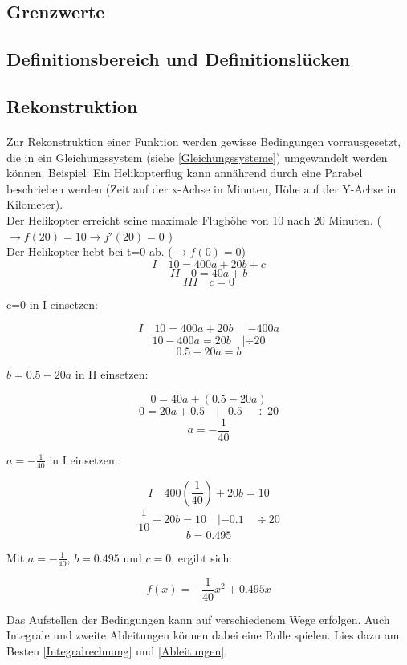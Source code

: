 \documentclass{article}
\begin{document}
	\subsection{Grenzwerte}
	
	\subsection{Definitionsbereich und Definitionslücken}\label{Definitionsbereich}
	\subsection{Rekonstruktion}\label{Rekonstruktion}
		\paragraph{}
			Zur Rekonstruktion einer Funktion werden gewisse Bedingungen vorrausgesetzt, die in ein Gleichungssystem (siehe \ref{Gleichungssysteme}) umgewandelt werden können.
			Beispiel: Ein Helikopterflug kann annährend durch eine Parabel beschrieben werden (Zeit auf der x-Achse in Minuten, Höhe auf der Y-Achse in Kilometer). \\
			Der Helikopter erreicht seine maximale Flughöhe von 10 nach 20 Minuten. ( $ \rightarrow f(20)=10 \rightarrow f'(20)=0 $ ) \\
			Der Helikopter hebt bei t=0 ab. ($ \rightarrow f(0)=0$) \\
			
			\[ I \quad 10=400a+20b+c \]
			\[ II \quad 0=40a+b \]
			\[ III \quad c=0 \]
			
			c=0 in I einsetzen:
			
			\[I \quad 10=400a+20b \quad |-400a \]
			\[ 10-400a=20b \quad | \div 20\]
			\[ 0.5-20a=b\]
			
			$b= 0.5-20a $ in II einsetzen:
			
			\[ 0=40a+(0.5-20a)\]
			\[ 0=20a+0.5 \quad |-0.5 \quad \div 20\]
			\[ a=-\frac{1}{40} \]
			
			$a=-\frac{1}{40}$ in I einsetzen:
			
			\[ I \quad 400(\frac{1}{40})+20b=10 \]
			\[ \frac{1}{10}+20b=10 \quad |-0.1 \quad \div 20\]
			\[ b=0.495\]
			
			Mit $a=-\frac{1}{40}$, $b=0.495$ und $c=0$, ergibt sich:
			
			\[f(x)=-\frac{1}{40}x^2+0.495x\]
			
			Das Aufstellen der Bedingungen kann auf verschiedenem Wege erfolgen. Auch Integrale und zweite Ableitungen können dabei eine Rolle spielen.
			Lies dazu am Besten \ref{Integralrechnung} und \ref{Ableitungen}.
			
\end{document}
